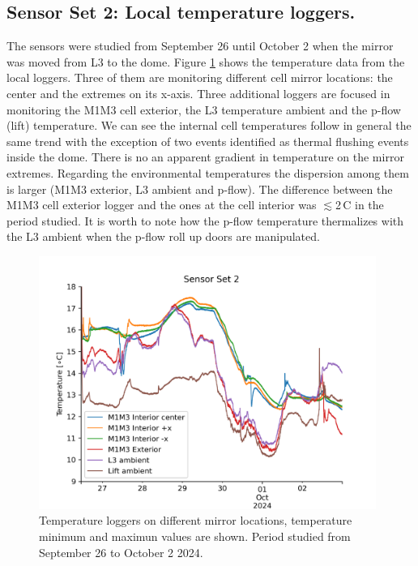 \documentclass[SE,lsstdraft,authoryear,toc]{lsstdoc}
\begin{document}
\subsection{Sensor Set 2: Local temperature loggers.}
The sensors were studied from September 26 until October 2 when the mirror was moved from L3 to the dome. Figure \ref{fig_set2_raw} shows the temperature data from the local loggers. Three of them are monitoring different cell mirror locations: the center and the extremes on its x-axis. Three additional loggers are focused in monitoring the M1M3 cell exterior, the L3 temperature ambient and the p-flow (lift) temperature. We can see the internal cell temperatures follow in general the same trend with the exception of two events identified as thermal flushing events inside the dome. There is no an apparent gradient in temperature on the mirror extremes. Regarding the environmental temperatures the dispersion among them is larger (M1M3 exterior, L3 ambient and p-flow). The difference between the M1M3 cell exterior logger and the ones at the cell interior was $\lesssim$2\,\textdegree C in the period studied. It is worth to note how the p-flow temperature thermalizes with the L3 ambient when the p-flow roll up doors are manipulated.

\begin{figure}[h!]
  \centering
  \includegraphics[width=11cm]{SITCOMTN-141_figures/Sensor2_raw.png}
  \caption{Temperature loggers on different mirror locations, temperature minimum and maximun values are shown. Period studied from September 26 to October 2 2024. }
  \label{fig_set2_raw}
\end{figure}
\end{document}
